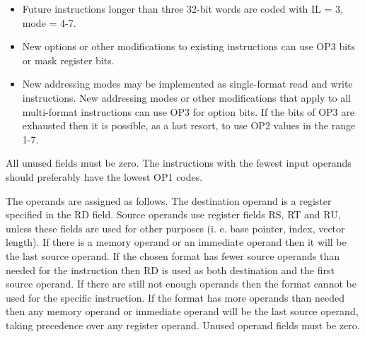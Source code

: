 \documentclass[forwardcom.tex]{subfiles}
\begin{document}
\begin{itemize}
\item Future instructions longer than three 32-bit words are coded with IL = 3, mode = 4-7.

\item New options or other modifications to existing instructions can use OP3 bits or mask register bits.

\item New addressing modes may be implemented as single-format read and write instructions. New addressing modes or other modifications that apply to all multi-format instructions can use OP3 for option bits. If the bits of OP3 are exhausted then it is possible, as a last resort, to use OP2 values in the range 1-7.


\end{itemize}

All unused fields must be zero. The instructions with the fewest input operands should preferably have the lowest OP1 codes. 
\vspace{2mm}

The operands are assigned as follows. The destination operand is a register specified in the RD field. Source operands use register fields RS, RT and RU, unless these fields are used for other purposes (i. e. base pointer, index, vector length). If there is a memory operand or an immediate operand then it will be the last source operand. If the chosen format has fewer source operands than needed for the instruction then RD is used as both destination and the first source operand. If there are still not enough operands then the format cannot be used for the specific instruction. If the format has more operands than needed then any memory operand or immediate operand will be the last source operand, taking precedence over any register operand. Unused operand fields must be zero.
\end{document}
